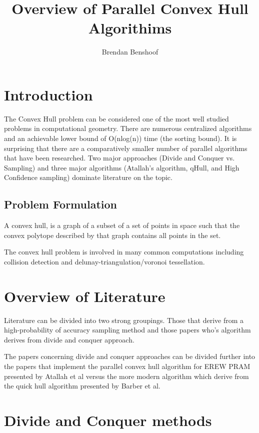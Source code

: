 \documentclass[10pt,a4paper,draft]{report}
\author{Brendan Benshoof}
\title{Overview of Parallel Convex Hull Algorithims}
\begin{document}
\maketitle{}


\section{Introduction}

The Convex Hull problem can be considered one of the most well studied problems in computational geometry. There are numerous centralized algorithms and an achievable lower bound of O(nlog(n)) time (the sorting bound). It is surprising that there are a comparatively smaller number of parallel algorithms that have been researched.
Two major approaches (Divide and Conquer vs. Sampling) and three major algorithms (Atallah's algorithm, qHull, and High Confidence sampling) dominate literature on the topic.
 

\subsection{Problem Formulation}

A convex hull, is a graph of a subset of a set of points in space such that the convex polytope described by that graph contains all points in the set.

The convex hull problem is involved in many common computations including collision detection and delunay-triangulation/voronoi tessellation.


\section{Overview of Literature}

Literature can be divided into two strong groupings. Those that derive from a high-probability of accuracy sampling method and those papers who's algorithm derives from divide and conquer approach.

The papers concerning divide and conquer approaches can be divided further into the papers that implement the parallel convex hull algorithm for EREW PRAM presented by Atallah et al versus the more modern algorithm which derive from the quick hull algorithm presented by Barber et al.


\section{Divide and Conquer methods}
\end{document}
